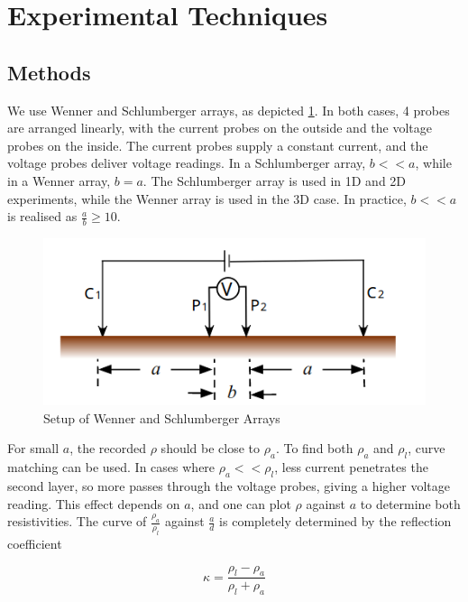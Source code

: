 \documentclass[12pt]{IEEEtran}
\begin{document}
\section{Experimental Techniques}

\subsection{Methods}

We use Wenner and Schlumberger arrays, as depicted \ref{array}. In both cases, 4 probes are arranged linearly, with the current probes on the outside and the voltage probes on the inside. The current probes supply a constant current, and the voltage probes deliver voltage readings. In a Schlumberger array, $b << a$, while in a Wenner array, $b = a$. The Schlumberger array is used in 1D and 2D experiments, while the Wenner array is used in the 3D case. In practice, $b << a$ is realised as $\frac{a}{b} \geq 10$.

\begin{figure} \label{array}
    \begin{center}
    \includegraphics[scale=0.5]{array.png}
    \caption{Setup of Wenner and Schlumberger Arrays~\cite{manual}}
    \end{center}
\end{figure}
    
For small $a$, the recorded $\rho$ should be close to $\rho_a$. To find both $\rho_a$ and $\rho_l$, curve matching can be used. In cases where $\rho_a << \rho_l$, less current penetrates the second layer, so more passes through the voltage probes, giving a higher voltage reading. This effect depends on $a$, and one can plot $\rho$ against $a$ to determine both resistivities. The curve of $\frac{\rho_a}{\rho_l}$ against $\frac{a}{d}$ is completely determined by the reflection coefficient

\begin{equation}
    \kappa = \frac{\rho_l-\rho_a}{\rho_l+\rho_a}
\end{equation}
\end{document}

